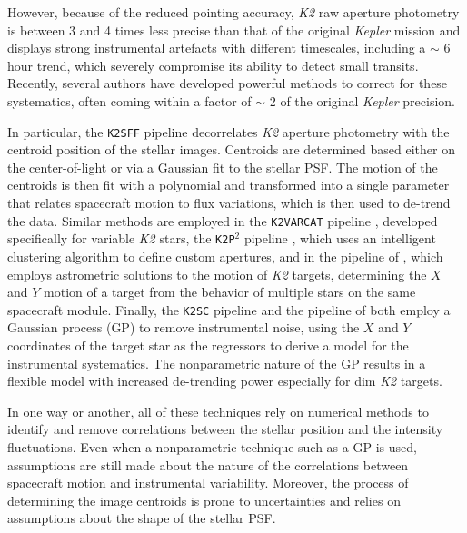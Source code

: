 \documentclass[]{emulateapj}
\begin{document}
However, because of the reduced pointing accuracy, \emph{K2} raw aperture photometry is between 
3 and 4 times less precise than that of the original \emph{Kepler} mission and displays
strong instrumental artefacts with different timescales, including a $\sim$ 6 hour trend, which
severely compromise its ability to detect small transits. Recently, several authors
have developed powerful methods to correct for these systematics, often coming within
a factor of $\sim$ 2 of the original \emph{Kepler} precision.

In particular, the \texttt{K2SFF} pipeline \citep{VJ14} decorrelates \emph{K2} aperture 
photometry with the centroid position
of the stellar images. Centroids are determined based either on the center-of-light
or via a Gaussian fit to the stellar PSF. The motion of the centroids is then fit with a polynomial
and transformed into a single parameter that relates spacecraft motion to flux variations,
which is then used to de-trend the data. Similar methods are employed in the \texttt{K2VARCAT} pipeline \citep{ARM15}, 
developed specifically for variable \emph{K2} stars, the \texttt{K2P$^2$} pipeline \citep{LUN15},
which uses an intelligent clustering algorithm to define custom apertures, and in the pipeline
of \cite{HUA15}, which employs astrometric solutions to the motion of \emph{K2} targets,
determining the $X$ and $Y$ motion of a target from the behavior of multiple stars on
the same spacecraft module. Finally, the \texttt{K2SC} pipeline \citep{AIG15,AIG16} and 
the pipeline of \cite{CRO15} both employ a Gaussian process (GP) to remove
instrumental noise, using the $X$ and $Y$ coordinates of the target star as the regressors to derive
a model for the instrumental systematics. The nonparametric nature of the GP results 
in a flexible model with increased de-trending power especially for dim \emph{K2}
targets.

In one way or another, all of these techniques rely on numerical methods to identify and 
remove correlations between the stellar position and the intensity fluctuations. Even
when a nonparametric technique such as a GP is used, assumptions are still made about
the nature of the correlations between spacecraft motion and instrumental variability.
Moreover, the process of determining the image centroids is prone to uncertainties
and relies on assumptions about the shape of the stellar PSF.
\end{document}
